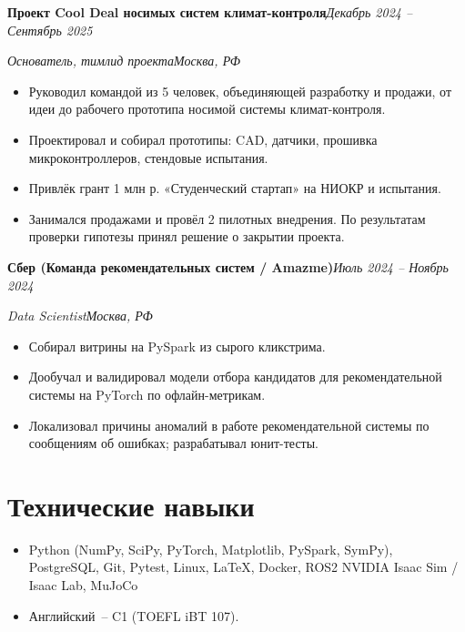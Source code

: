 \documentclass[10pt,a4paper]{article}
\newcommand{\entry}[4]{%
  \par\noindent\textbf{#1}\hfill\textit{#2}\par
  \noindent\textit{#3}\hfill\textit{#4}\par\vspace{2pt}}
\newcommand{\entrygap}{\par\vspace{0.5cm}}
\begin{document}
\entry{Проект Cool Deal носимых систем климат-контроля}{Декабрь 2024 -- Сентябрь 2025}{Основатель, тимлид проекта}{Москва, РФ}
\begin{itemize}[leftmargin=*,nosep]
\item Руководил командой из 5 человек, объединяющей разработку и продажи, от идеи до рабочего прототипа носимой системы климат-контроля.
\item Проектировал и собирал прототипы: CAD, датчики, прошивка микроконтроллеров, стендовые испытания.
\item Привлёк грант 1 млн р. «Студенческий стартап» на НИОКР и испытания.
\item Занимался продажами и провёл 2 пилотных внедрения. По результатам проверки гипотезы принял решение о закрытии проекта.
\end{itemize}

\entrygap

\entry{Сбер (Команда рекомендательных систем / Amazme)}{Июль 2024 -- Ноябрь 2024}{Data Scientist}{Москва, РФ}
\begin{itemize}[leftmargin=*,nosep]
\item Собирал витрины на PySpark из сырого кликстрима.
\item Дообучал и валидировал модели отбора кандидатов для рекомендательной системы на PyTorch по офлайн-метрикам.
\item Локализовал причины аномалий в работе рекомендательной системы по сообщениям об ошибках; разрабатывал юнит-тесты.
\end{itemize}

\vspace{0.2cm}



\section*{Технические навыки}

\begin{itemize}[leftmargin=*,nosep]
\item Python (NumPy, SciPy, PyTorch, Matplotlib, PySpark, SymPy), PostgreSQL, Git, Pytest, Linux, \LaTeX, Docker, ROS2 NVIDIA Isaac Sim / Isaac Lab, MuJoCo
\item Английский~-- C1 (TOEFL iBT 107).
\end{itemize}
\end{document}
